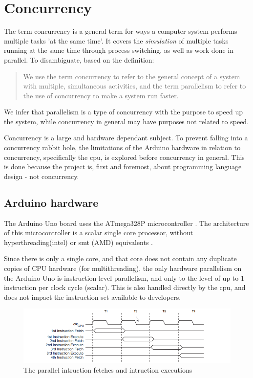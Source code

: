 \section{Concurrency}\label{sec:concurrency}
The term concurrency is a general term for ways a computer system performs multiple tasks 'at the same time'. It covers the \textit{simulation} of multiple tasks running at the same time through process switching, as well as work done in parallel. To disambiguate, based on the definition:

\blockcquote{Bryant2016}{We use the term concurrency to refer to the general concept of a system with multiple, simultaneous activities, and the term parallelism to refer to the use of concurrency to make a system run faster.}

We infer that parallelism is a type of concurrency with the purpose to speed up the system, while concurrency in general may have purposes not related to speed.

Concurrency is a large and hardware dependant subject. To prevent falling into a concurrency rabbit hole, the limitations of the Arduino hardware in relation to concurrency, specifically the \gls{cpu}, is explored before concurrency in general. This is done because the project is, first and foremost, about programming language design - not concurrency.

\subsection{Arduino hardware}\label{subsec:arduinohardware}
The Arduino Uno board uses the ATmega328P microcontroller \cite{ArduinoUno}. The architecture of this microcontroller is a scalar single core processor, without hyperthreading(intel) or \gls{smt} (AMD) equivalents \cite{ATmega328P}.

Since there is only a single core, and that core does not contain any duplicate copies of CPU hardware (for multithreading), the only hardware parallelism on the Arduino Uno is instruction-level parallelism, and only to the level of up to 1 instruction per clock cycle (scalar). This is also handled directly by the \gls{cpu}, and does not impact the instruction set available to developers.


\begin{figure}[htb!]
    \centering
    \includegraphics[width=\textwidth]{figures/Arduino_Pipeline.png}
    \caption{The parallel intruction fetches and intruction executions \cite{ATmega328P}}
    \label{fig:arduinopipeline}
\end{figure}


